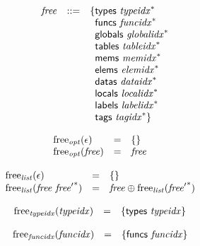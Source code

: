 $$
\begin{array}[t]{@{}lrrl@{}l@{}}
& {\mathit{free}} & ::= & \{ \begin{array}[t]{@{}l@{}l@{}}
\mathsf{types}~{{\mathit{typeidx}}^\ast} \\
\mathsf{funcs}~{{\mathit{funcidx}}^\ast} \\
\mathsf{globals}~{{\mathit{globalidx}}^\ast} \\
\mathsf{tables}~{{\mathit{tableidx}}^\ast} \\
\mathsf{mems}~{{\mathit{memidx}}^\ast} \\
\mathsf{elems}~{{\mathit{elemidx}}^\ast} \\
\mathsf{datas}~{{\mathit{dataidx}}^\ast} \\
\mathsf{locals}~{{\mathit{localidx}}^\ast} \\
\mathsf{labels}~{{\mathit{labelidx}}^\ast} \\
\mathsf{tags}~{{\mathit{tagidx}}^\ast} \} \\
\end{array} \\
\end{array}
$$

\vspace{1ex}

$$
\begin{array}[t]{@{}lcl@{}l@{}}
{\mathrm{free}}_{\mathit{opt}}(\epsilon) & = & \{  \} \\
{\mathrm{free}}_{\mathit{opt}}({\mathit{free}}) & = & {\mathit{free}} \\
\end{array}
$$

$$
\begin{array}[t]{@{}lcl@{}l@{}}
{\mathrm{free}}_{\mathit{list}}(\epsilon) & = & \{  \} \\
{\mathrm{free}}_{\mathit{list}}({\mathit{free}}~{{\mathit{free}'}^\ast}) & = & {\mathit{free}} \oplus {\mathrm{free}}_{\mathit{list}}({{\mathit{free}'}^\ast}) \\
\end{array}
$$

\vspace{1ex}

$$
\begin{array}[t]{@{}lcl@{}l@{}}
{\mathrm{free}}_{\mathit{typeidx}}({\mathit{typeidx}}) & = & \{ \mathsf{types}~{\mathit{typeidx}} \} \\
\end{array}
$$

$$
\begin{array}[t]{@{}lcl@{}l@{}}
{\mathrm{free}}_{\mathit{funcidx}}({\mathit{funcidx}}) & = & \{ \mathsf{funcs}~{\mathit{funcidx}} \} \\
\end{array}
$$

